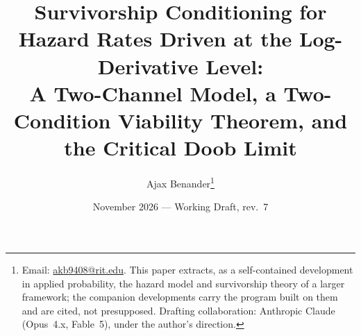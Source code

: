 \newcommand{\PP}{\mathbb{P}}
\newcommand{\E}{\mathbb{E}}
\newcommand{\R}{\mathbb{R}}
\newcommand{\one}{\mathbf{1}}
\newcommand{\hm}{\mathsf{h}}
\newcommand{\Fc}{\mathcal{F}}
\newcommand{\Lc}{\mathcal{L}}
\newcommand{\Imm}{\mathsf{V}}
\DeclareMathOperator{\Leb}{Leb}

\title{Survivorship Conditioning for Hazard Rates Driven at the
Log-Derivative Level:\\ \large A Two-Channel Model, a Two-Condition
Viability Theorem, and the Critical Doob Limit}
\author{Ajax Benander\thanks{Email:
\href{mailto:akb9408@rit.edu}{akb9408@rit.edu}. This paper extracts, as
a self-contained development in applied probability, the hazard model
and survivorship theory of a larger framework; the companion
developments carry the program built on them and are cited, not
presupposed. Drafting collaboration: Anthropic Claude (Opus~4.x,
Fable~5), under the author's direction.}}
\date{November 2026 --- Working Draft, rev.~7}


\maketitle

